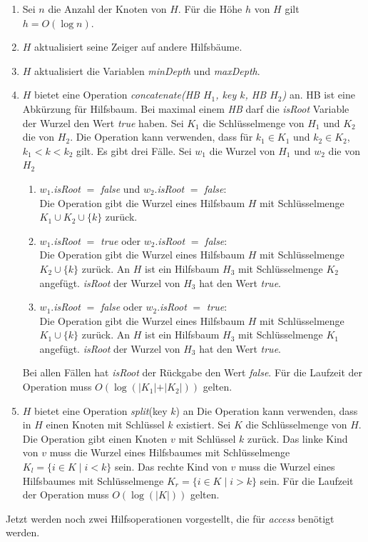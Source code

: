 \documentclass[a4paper,12pt]{article}
\begin{document}
\begin{enumerate}
	\item Sei $n$ die Anzahl der Knoten von $H$. Für die Höhe $h$ von $H$ gilt $h = O\left(\log n\right)$.
	\item $H$ aktualisiert seine Zeiger auf andere Hilfsbäume.
	\item $H$ aktualisiert die Variablen  \textit{minDepth} und \textit{maxDepth}.
	\item $H$ bietet eine Operation \textit{concatenate(HB $H_1$, key $k$, HB  $H_2$)} an. HB ist eine Abkürzung für Hilfsbaum. Bei maximal einem \textit{HB}  darf die \textit{isRoot} Variable der Wurzel den Wert \textit{true} haben. Sei $K_1$ die Schlüsselmenge von $H_1$ und $K_2$ die von $H_2$. Die Operation kann verwenden, dass für $k_1 \in K_1$ und $k_2 \in K_2$, $k_1 < k < k_2$ gilt. Es gibt drei Fälle. Sei $w_1$ die Wurzel von $H_1$ und $w_2$ die von $H_2$
	\begin{enumerate}
		\item $w_1$.\textit{isRoot} $=$ \textit{false} und $w_2$.\textit{isRoot} $=$ \textit{false}:\\
		Die Operation gibt die Wurzel eines Hilfsbaum $H$ mit Schlüsselmenge $K_1 \cup K_2 \cup \{k\} $ zurück.
		\item $w_1$.\textit{isRoot} $=$ \textit{true} oder $w_2$.\textit{isRoot} $=$ \textit{false}:\\	
		Die Operation gibt die Wurzel eines Hilfsbaum $H$ mit Schlüsselmenge $K_2 \cup \{k\} $ zurück. An $H$ ist ein Hilfsbaum $H_3$ mit Schlüsselmenge $K_2$ angefügt. \textit{isRoot} der Wurzel von $H_3$ hat den Wert \textit{true}.
		\item $w_1$.\textit{isRoot} $=$ \textit{false} oder $w_2$.\textit{isRoot} $=$ \textit{true}:\\	
		Die Operation gibt die Wurzel eines Hilfsbaum $H$ mit Schlüsselmenge $K_1 \cup \{k\} $ zurück. An $H$ ist ein Hilfsbaum $H_3$ mit Schlüsselmenge $K_1$ angefügt. \textit{isRoot} der Wurzel von $H_3$ hat den Wert \textit{true}.	 
	\end{enumerate}
	Bei allen Fällen hat \textit{isRoot} der Rückgabe den Wert \textit{false}.
	Für die Laufzeit der Operation muss $O\left(\log \left(\vert K_1 \vert + \vert K_2 \vert\right)\right)$ gelten.
	\item $H$ bietet eine Operation \textit{split}(key $k$) an Die Operation kann verwenden, dass in $H$ einen Knoten mit Schlüssel $k$ existiert. Sei $K$ die Schlüsselmenge von $H$. Die Operation gibt einen Knoten $v$ mit Schlüssel $k$ zurück. Das linke Kind von $v$ muss die Wurzel eines Hilfsbaumes mit Schlüsselmenge ${K_l=\{i\in K \mid  i <k\}}$ sein. Das rechte Kind von $v$ muss die Wurzel eines Hilfsbaumes mit Schlüsselmenge ${K_r=\{i\in K \mid  i > k\}}$ sein. Für die Laufzeit der Operation muss $O\left(\log \left(\vert K \vert\right) \right)$ gelten.
\end{enumerate} 
Jetzt werden noch zwei Hilfsoperationen vorgestellt, die für \textit{access} benötigt werden.\\
\end{document}
